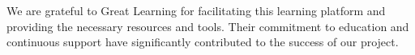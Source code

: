 \documentclass[11pt]{report}
\begin{document}
We are grateful to Great Learning for facilitating this learning platform and providing the necessary resources and tools. Their commitment to education and continuous support have significantly contributed to the success of our project.

\tableofcontents
\listoffigures
\listoftables

\newpage
\setcounter{page}{0}




\renewcommand\bibname{References}
\printbibliography


\end{document}
